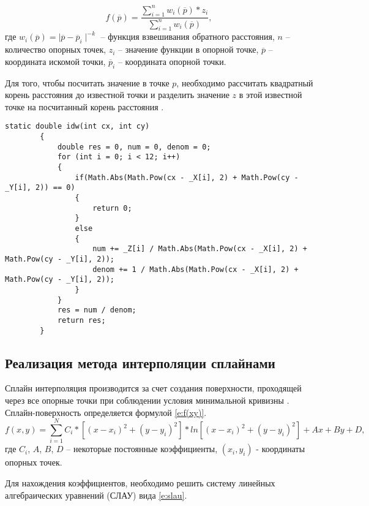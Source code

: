 \begin{equation} \label{e:f(p)}
f(\overline{p}) =  \frac{\sum_{i=1}^{n}{w_i(\overline{p}) * z_i}}{\sum_{i=1}^{n}{w_i(\overline{p})}},
\end{equation}
где \(w_i(\overline{p}) = \mid \overline{p}-\overline{p}_i \mid ^{-k}\) -- функция взвешивания обратного расстояния, $n$ -- количество опорных точек, $z_i$ -- значение функции в опорной точке, $\overline{p}$ -- координата искомой точки,  $\overline{p}_i$ -- координата опорной точки.

Для того, чтобы посчитать значение в точке $p$, необходимо рассчитать квадратный корень расстояния до известной точки и разделить значение $z$ в этой известной точке на посчитанный корень расстояния \cite{25, 27}. 

\begin{lstlisting}[caption={Метод средневзвешенной интерполяции}, label={ls:04}]
static double idw(int cx, int cy)
        {
            double res = 0, num = 0, denom = 0;
            for (int i = 0; i < 12; i++)
            {
                if(Math.Abs(Math.Pow(cx - _X[i], 2) + Math.Pow(cy - _Y[i], 2)) == 0)
                {
                    return 0;
                }
                else
                {
                    num += _Z[i] / Math.Abs(Math.Pow(cx - _X[i], 2) + Math.Pow(cy - _Y[i], 2));
                    denom += 1 / Math.Abs(Math.Pow(cx - _X[i], 2) + Math.Pow(cy - _Y[i], 2));
                }
            }
            res = num / denom;
            return res;
        }
\end{lstlisting}

\subsection{Реализация метода интерполяции сплайнами}

Сплайн интерполяция производится за счет создания поверхности, проходящей через все опорные точки при соблюдении условия минимальной кривизны \cite{24,26}. Сплайн-поверхность определяется формулой \ref{e:f(xy)}. 
\begin{equation} \label{e:f(xy)}
f(x,y) = \sum^N_{i=1} C_i *[(x - x_i)^2 + (y - y_i)^2] * ln[(x - x_i)^2 + (y- y_i)^2] + Ax + By + D,
\end{equation}
где $C_i$, $A$, $B$, $D$ -- некоторые постоянные коэффициенты, $(x_i, y_i)$ - координаты опорных точек.

Для нахождения коэффициентов, необходимо решить систему линейных алгебраических уравнений (СЛАУ) вида \ref{e:slau}. 

